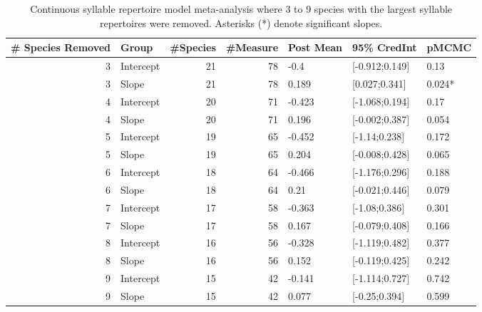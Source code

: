 \documentclass{article}
\begin{document}
  
  \begin{table}[H]
  \centering
  \caption{Continuous syllable repertoire model meta-analysis where 3 to 9 species with the largest syllable repertoires were removed.  Asterisks (*) denote significant slopes.} 
  \begin{tabular}{rlrrlll}
  \hline
  \# Species Removed & Group & \#Species & \#Measure & Post Mean & 95\% CredInt & pMCMC \\ 
  \hline
  3 & Intercept &  21 &  78 & -0.4 & [-0.912;0.149] & 0.13 \\ 
  3 & Slope &  21 &  78 & 0.189 & [0.027;0.341] & 0.024* \\ 
  4 & Intercept &  20 &  71 & -0.423 & [-1.068;0.194] & 0.17 \\ 
  4 & Slope &  20 &  71 & 0.196 & [-0.002;0.387] & 0.054 \\ 
  5 & Intercept &  19 &  65 & -0.452 & [-1.14;0.238] & 0.172 \\ 
  5 & Slope &  19 &  65 & 0.204 & [-0.008;0.428] & 0.065 \\ 
  6 & Intercept &  18 &  64 & -0.466 & [-1.176;0.296] & 0.188 \\ 
  6 & Slope &  18 &  64 & 0.21 & [-0.021;0.446] & 0.079 \\ 
  7 & Intercept &  17 &  58 & -0.363 & [-1.08;0.386] & 0.301 \\ 
  7 & Slope &  17 &  58 & 0.167 & [-0.079;0.408] & 0.166 \\ 
  8 & Intercept &  16 &  56 & -0.328 & [-1.119;0.482] & 0.377 \\ 
  8 & Slope &  16 &  56 & 0.152 & [-0.119;0.425] & 0.242 \\ 
  9 & Intercept &  15 &  42 & -0.141 & [-1.114;0.727] & 0.742 \\ 
  9 & Slope &  15 &  42 & 0.077 & [-0.25;0.394] & 0.599 \\ 
  \hline
  \end{tabular}
  \end{table}
  
\end{document}
